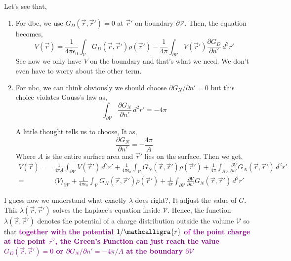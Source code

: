\documentclass{article}
\newcommand{\scriptr}{\mathord{\mathcalligra{r}}}
\begin{document}
Let's see that,
\begin{enumerate}
    \item For \gls{dbc}, we use $G_D(\vec{r},\vec{r}') = 0$ at $\vec{r}'$ on boundary $\partial \mathcal{V}$. Then, the equation becomes,
    \begin{equation*}
        V(\vec{r}) = \frac{1}{4\pi \epsilon_0}\int_{\mathcal{V}}G_D(\vec{r},\vec{r}')\rho(\vec{r}') - \frac{1}{4\pi} \int_{\partial \mathcal{V}}V(\vec{r}')\frac{\partial G_D}{\partial n'} \, d^2 r'
    \end{equation*}
    See now we only have $V$ on the boundary and that's what we need. We don't even have to worry about the other term.
    \item For \gls{nbc}, we can think obviously we should choose $\partial G_N/\partial n' = 0$ but this choice violates Gauss's law as,
    \begin{equation*}
        \int_{\partial \mathcal{V}}\frac{\partial G_N}{\partial n'}\, d^2 r' = -4\pi
    \end{equation*}

    A little thought tells us to choose, It as,
    \begin{equation}
        \frac{\partial G_N}{\partial n'}=-\frac{4\pi}{A}
    \end{equation}
    Where $A$ is the entire surface area and $\vec{r}'$ lies on the surface. Then we get,
    \begin{equation*}
    \begin{split}
        V(\vec{r}) =&  \frac{1}{4\pi A} \int_{\partial \mathcal{V}}V(\vec{r}')\, d^2r' +\frac{1}{4\pi \epsilon_0}\int_{\mathcal{V}}G_N(\vec{r},\vec{r}')\rho(\vec{r}') + \frac{1}{4\pi} \int_{\partial \mathcal{V}}\frac{\partial V}{\partial n'}G_N(\vec{r},\vec{r}') \, d^2 r'\\
         =& \langle V \rangle_{\partial \mathcal{V}} +\frac{1}{4\pi \epsilon_0}\int_{\mathcal{V}}G_N(\vec{r},\vec{r}')\rho(\vec{r}') + \frac{1}{4\pi} \int_{\partial \mathcal{V}}\frac{\partial V}{\partial n'}G_N(\vec{r},\vec{r}') \, d^2 r'
    \end{split}
    \end{equation*}
\end{enumerate}
I guess now we understand what exactly $\lambda$ does right?, It adjust the value of $G$. This $\lambda(\vec{r},\vec{r}')$ solves the Laplace's equation inside $\mathcal{V}$. Hence, the function $\lambda(\vec{r},\vec{r}')$ denotes the potential of a charge distribution outside the volume $\mathcal{V}$ so that \textcolor{purple}{\textbf{together with the potential $1/\scriptr$ of the point charge at the point $\vec{r}'$, the Green's Function can just reach the value $G_D(\vec{r},\vec{r}')=0$ or $\partial G_N/\partial n' = -4\pi/A$ at the boundary $\partial \mathcal{V}$}}
\end{document}
